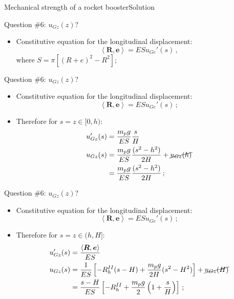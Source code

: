 \documentclass{beamer}
\newcommand{\uj}{u}
\newcommand{\zj}{z}
\newcommand{\ej}{e}
\newcommand{\ev}{{\boldsymbol\ej}}
\newcommand{\Rj}{R}
\newcommand{\Fresj}{R}
\newcommand{\Fres}{{\boldsymbol\Fresj}}
\newcommand{\scal}[1]{\left\langle{#1}\right\rangle}
\begin{document}
\begin{frame}{Mechanical strength of a rocket booster}{Solution}

\begin{overprint}

\vskip-20pt
\begin{exampleblock}{Question \#6: $\uj_{G\zj}(\zj)$?}
\begin{itemize}
\item Constitutive equation for the longitudinal displacement:
\begin{displaymath}
\scal{\Fres,\ev}=ES\uj_{Ge}'(s)\,,
\end{displaymath}
where $S=\pi[(R+e)^2-R^2]$;
\end{itemize}
\end{exampleblock}

\vskip-20pt
\begin{exampleblock}{Question \#6: $\uj_{G\zj}(\zj)$?}
\begin{itemize}
\item Constitutive equation for the longitudinal displacement:
\begin{displaymath}
\scal{\Fres,\ev}=ES\uj_{Ge}'(s)\,;
\end{displaymath}
\item Therefore for $s=\zj\in[0,h)$:
\begin{displaymath}
\begin{split}
\uj_{G\zj}'(s) &=\frac{m_pg}{ES}\frac{s}{H} \\
\uj_{G\zj}(s) &=\frac{m_pg}{ES}\frac{(s^2-h^2)}{2H}+\cancel{\uj_{G\zj}(h)} \\
&=\frac{m_pg}{ES}\frac{(s^2-h^2)}{2H}\,;
\end{split}
\end{displaymath}
\end{itemize}
\end{exampleblock}

\vskip-20pt
\begin{exampleblock}{Question \#6: $\uj_{G\zj}(\zj)$?}
\begin{itemize}
\item Constitutive equation for the longitudinal displacement:
\begin{displaymath}
\scal{\Fres,\ev}=ES\uj_{Ge}'(s)\,;
\end{displaymath}
\item Therefore for $s=\zj\in(h,H]$:
\begin{displaymath}
\begin{split}
\uj_{G\zj}'(s) &=\frac{\scal{\Fres,\ev}}{ES} \\
\uj_{G\zj}(s) &= \frac{1}{ES}\left[-\Rj_h^{II}(s-H)+\frac{m_pg}{2H}(s^2-H^2)\right]+\cancel{\uj_{G\zj}(H)} \\
&=\frac{s-H}{ES}\left[-\Rj_h^{II}+\frac{m_pg}{2}\left(1+\frac{s}{H}\right)\right]\,;
\end{split}
\end{displaymath}
\end{itemize}
\end{exampleblock}


\end{overprint}
\end{frame}
\end{document}
